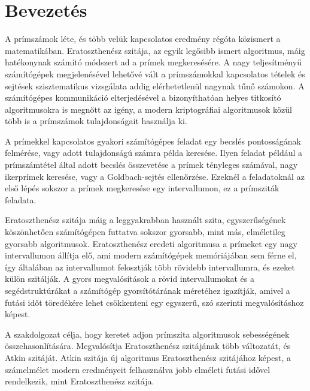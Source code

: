 \documentclass[12pt]{report}
\begin{document}
\tableofcontents

\chapter{Bevezetés}

A prímszámok léte, és több velük kapcsolatos eredmény régóta közismert a matematikában.
Eratoszthenész szitája, az egyik legősibb ismert algoritmus, máig hatékonynak számító módszert ad a prímek megkeresésére.
A nagy teljesítményű számítógépek megjelenésével lehetővé vált a prímszámokkal kapcsolatos tételek és sejtések szisztematikus vizsgálata addig elérhetetlenül nagynak tűnő számokon.
A számítógépes kommunikáció elterjedésével a bizonyíthatóan helyes titkosító algoritmusokra is megnőtt az igény, a modern kriptográfiai algoritmusok közül több is a prímszámok tulajdonságait használja ki.

A prímekkel kapcsolatos gyakori számítógépes feladat egy becslés pontosságának felmérése, vagy adott tulajdonságú számra példa keresése.
Ilyen feladat például a prímszámtétel által adott becslés összevetése a prímek tényleges számával, nagy ikerprímek keresése\cite{twinprimes}, vagy a Goldbach-sejtés ellenőrzése\cite{gaps}.
Ezeknél a feladatoknál az első lépés sokszor a prímek megkeresése egy intervallumon, ez a prímsziták feladata.

Eratoszthenész szitája máig a leggyakrabban használt szita, egyszerűségének köszönhetően számítógépen futtatva sokszor gyorsabb, mint más, elméletileg gyorsabb algoritmusok.
Eratoszthenész eredeti algoritmusa a prímeket egy nagy intervallumon állítja elő, ami modern számítógépek memóriájában sem férne el, így általában az intervallumot felosztják több rövidebb intervallumra, és ezeket külön szitálják.
A gyors megvalósítások a rövid intervallumokat és a segédstruktúrákat a számítógép gyorsítótárának méretéhez igazítják, amivel a futási időt töredékére lehet csökkenteni egy egyszerű, szó szerinti megvalósításhoz képest.

A szakdolgozat célja, hogy keretet adjon prímszita algoritmusok sebességének összehasonlítására.
Megvalósítja Eratoszthenész szitájának több változatát, és Atkin szitáját\cite{atkin}.
Atkin szitája új algoritmus Eratoszthenész szitájához képest, a számelmélet modern eredményeit felhasználva jobb elméleti futási idővel rendelkezik, mint Eratoszthenész szitája.






\end{document}
